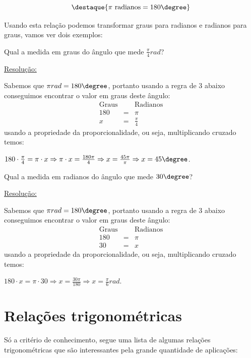   \[\destaque{\pi \text{ radianos}= 180 \degree}\]

  Usando esta relação podemos transformar graus para radianos e radianos para graus, vamos ver dois exemplos:

  \begin{exem}
   Qual a medida em graus do ângulo que mede $\frac{\pi}{4} rad$?

   \underline{Resolução:}

   Sabemos que $\pi rad= 180\degree$, portanto usando a regra de 3 abaixo conseguimos encontrar o valor em graus deste ângulo:
   \begin{eqnarray*}
  \text{Graus} & & \text{Radianos} \\
   180 & = & \pi\\
  x & = & \frac{\pi}{4}
 \end{eqnarray*}
 usando a propriedade da proporcionalidade, ou seja, multiplicando cruzado temos:

 $180 \cdot \frac{\pi}{4}= \pi \cdot x \Rightarrow \pi \cdot x= \frac{180 \pi}{4} \Rightarrow x= \frac{45 \pi}{\pi} \Rightarrow x= 45\degree$.

 \fim
  \end{exem}

  \begin{exem}
   Qual a medida em radianos do ângulo que mede $30\degree$?

   \underline{Resolução:}

   Sabemos que $\pi rad= 180\degree$, portanto usando a regra de 3 abaixo conseguimos encontrar o valor em graus deste ângulo:
   \begin{eqnarray*}
  \text{Graus} & & \text{Radianos} \\
   180 & = & \pi\\
  30 & = & x
 \end{eqnarray*}
 usando a propriedade da proporcionalidade, ou seja, multiplicando cruzado temos:

 $180 \cdot x= \pi \cdot 30 \Rightarrow x= \frac{30 \pi}{180} \Rightarrow x= \frac{\pi}{6} rad$.

 \fim
  \end{exem}



 \section{Relações trigonométricas}

 Só a critério de conhecimento, segue uma lista de algumas relações trigonométricas que são interessantes pela grande quantidade de aplicações:

